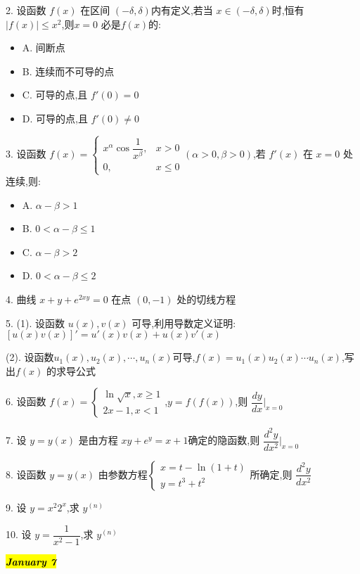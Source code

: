 2. 设函数 $f(x)$ 在区间 $(-\delta,\delta)$内有定义,若当 $x\in(-\delta,\delta)$时,恒有$|f(x)|\leq x^{2}$,则$x=0$ 必是$f(x)$的:
\begin{itemize}
	\item A. 间断点
	\item B. 连续而不可导的点
	\item C. 可导的点,且 $f'(0)=0$
	\item D. 可导的点,且 $f'(0)\neq 0$
\end{itemize}

3. 设函数 $f(x)=\begin{cases}
	x^{\alpha}\cos\dfrac{1}{x^{\beta}}, & x>0\\
	0,& x\leq 0
\end{cases}(\alpha>0,\beta>0)$,若 $f'(x)$ 在 $x=0$ 处连续,则:
\begin{itemize}
	\item A. $\alpha-\beta>1$
	\item B. $0<\alpha-\beta\leq 1$
	\item C. $\alpha-\beta>2$
	\item D. $0<\alpha-\beta\leq 2$
\end{itemize}

4. 曲线 $x+y+e^{2xy}=0$ 在点 $(0,-1)$ 处的切线方程

5.
(1). 设函数 $u(x),v(x)$ 可导,利用导数定义证明:$[u(x)v(x)]'=u'(x)v(x)+u(x)v'(x)$

(2). 设函数$u_{1}(x),u_{2}(x),\cdots,u_{n}(x)$可导,$f(x)=u_{1}(x)u_{2}(x)\cdots u_{n}(x)$,写出$f(x)$ 的求导公式

6. 设函数 $f(x)=\begin{cases}
	\ln\sqrt{x},x\geq 1\\2x-1,x<1
\end{cases}$,$y=f(f(x))$,则 $\dfrac{dy}{dx}|_{x=0}$

7. 设 $y=y(x)$ 是由方程 $xy+e^{y}=x+1$确定的隐函数,则 $\dfrac{d^{2}y}{dx^{2}}|_{x=0}$

8. 设函数 $y=y(x)$ 由参数方程$\begin{cases}
	x=t-\ln(1+t)\\y=t^{3}+t^{2}
\end{cases}$所确定,则 $\dfrac{d^{2}y}{dx^{2}}$

9. 设 $y=x^{2}2^{x}$,求 $y^{(n)}$

10. 设 $y=\dfrac{1}{x^{2}-1}$,求 $y^{(n)}$

\hl{\textbf{\textit{January 7}}}

